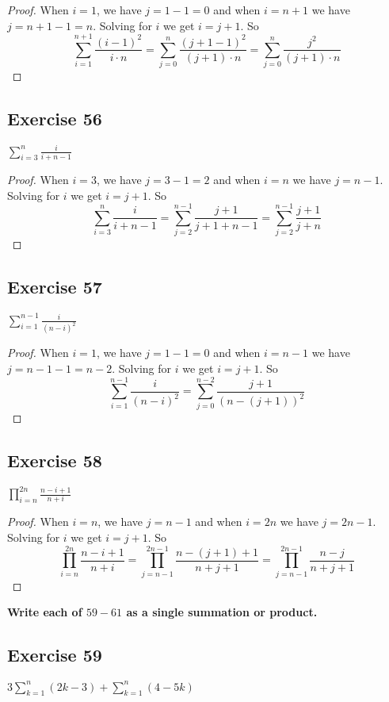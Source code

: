 \documentclass[14pt]{extarticle}
\newcommand{\dps}{\displaystyle}
\newcommand{\cy}{\color{cyan}}
\begin{document}
\begin{proof}
    When $i = 1$, we have $j = 1-1 = 0$ and when $i = n+1$ we have $j = n+1-1 = n$. Solving for $i$ we get $i = j+1$. So
    \[
        \sum_{i=1}^{n+1}\frac{(i-1)^2}{i\cdot n} = \sum_{j=0}^{n}\frac{(j+1-1)^2}{(j+1)\cdot n} = \sum_{j=0}^{n}\frac{j^2}{(j+1)\cdot n}
    \]
\end{proof}

\subsection{Exercise 56}
$\dps\sum_{i=3}^{n}\frac{i}{i+n-1}$

\begin{proof}
    When $i = 3$, we have $j = 3-1 = 2$ and when $i = n$ we have $j = n-1$. Solving for $i$ we get $i = j+1$. So
    \[
        \sum_{i=3}^{n}\frac{i}{i+n-1} = \sum_{j=2}^{n-1}\frac{j+1}{j+1+n-1} = \sum_{j=2}^{n-1}\frac{j+1}{j+n}
    \]
\end{proof}

\subsection{Exercise 57}
$\dps\sum_{i=1}^{n-1}\frac{i}{(n-i)^2}$

\begin{proof}
    When $i = 1$, we have $j = 1-1 = 0$ and when $i = n-1$ we have $j = n-1-1 = n-2$. Solving for $i$ we get $i = j+1$. So
    \[
        \sum_{i=1}^{n-1}\frac{i}{(n-i)^2} = \sum_{j=0}^{n-2}\frac{j+1}{(n-(j+1))^2}
    \]
\end{proof}

\subsection{Exercise 58}
$\dps\prod_{i=n}^{2n}\frac{n-i+1}{n+i}$

\begin{proof}
    When $i = n$, we have $j = n-1$ and when $i = 2n$ we have $j = 2n-1$. Solving for $i$ we get $i = j+1$. So
    \[
        \prod_{i=n}^{2n}\frac{n-i+1}{n+i} = \prod_{j=n-1}^{2n-1}\frac{n-(j+1)+1}{n+j+1} = \prod_{j=n-1}^{2n-1}\frac{n-j}{n+j+1}
    \]
\end{proof}

{\bf\cy Write each of $59-61$ as a single summation or product.}

\subsection{Exercise 59}
$\dps 3\sum_{k=1}^{n}(2k-3) + \sum_{k=1}^{n}(4-5k)$
\end{document}
